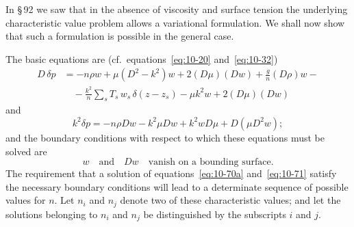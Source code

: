 In \S\,92 we saw that in the absence of viscosity and surface tension the underlying characteristic value problem allows a variational formulation. We shall now show that such a formulation is possible in the general case.

The basic equations are (cf.\ equations~\eqref{eq:10-20} and~\eqref{eq:10-32})
\begin{align}
\label{eq:10-70a}
D\,\delta p &= -n\rho w + \mu(D^2-k^2)w + 2(D\mu)(Dw) + \frac{g}{n}(D\rho)w - \nonumber\\
&\quad -\frac{k^2}{n}\sum_s T_s\,w_s\,\delta(z-z_s) - \mu k^2 w + 2(D\mu)(Dw)
\end{align}
and
\begin{equation}
\label{eq:10-71}
k^2\delta p = -n\rho Dw - k^2\mu Dw + k^2wD\mu + D(\mu D^2w);
\end{equation}
and the boundary conditions with respect to which these equations must be solved are
\begin{equation}
\label{eq:10-72}
w \quad\text{and}\quad Dw\quad\text{vanish on a bounding surface.}
\end{equation}
The requirement that a solution of equations~\eqref{eq:10-70a} and~\eqref{eq:10-71} satisfy the necessary boundary conditions will lead to a determinate sequence of possible values for $n$. Let $n_i$ and $n_j$ denote two of these characteristic values; and let the solutions belonging to $n_i$ and $n_j$ be distinguished by the subscripts $i$ and $j$.

